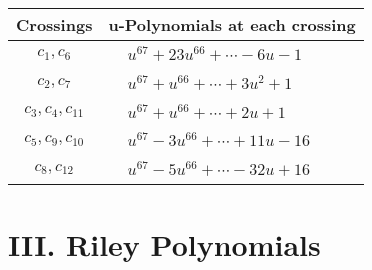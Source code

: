 \documentclass[1p]{elsarticle_modified}
\theoremstyle{definition}
\begin{document}
\begin{tabular}{m{50pt}|m{274pt}}
Crossings & \hspace{64pt}u-Polynomials at each crossing \\
\hline $$\begin{aligned}c_{1},c_{6}\end{aligned}$$&$\begin{aligned}
&u^{67}+23 u^{66}+\cdots-6 u-1
\end{aligned}$\\
\hline $$\begin{aligned}c_{2},c_{7}\end{aligned}$$&$\begin{aligned}
&u^{67}+u^{66}+\cdots+3 u^2+1
\end{aligned}$\\
\hline $$\begin{aligned}c_{3},c_{4},c_{11}\end{aligned}$$&$\begin{aligned}
&u^{67}+u^{66}+\cdots+2 u+1
\end{aligned}$\\
\hline $$\begin{aligned}c_{5},c_{9},c_{10}\end{aligned}$$&$\begin{aligned}
&u^{67}-3 u^{66}+\cdots+11 u-16
\end{aligned}$\\
\hline $$\begin{aligned}c_{8},c_{12}\end{aligned}$$&$\begin{aligned}
&u^{67}-5 u^{66}+\cdots-32 u+16
\end{aligned}$\\
\hline
\end{tabular}\newpage\renewcommand{\arraystretch}{1}
\centering \section*{ III. Riley Polynomials}
\end{document}
